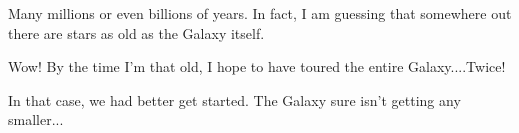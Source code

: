 \documentclass[main.tex]{subfiles}
\begin{document}
\par \Celaeno Many millions or even billions of years.  In fact, I am guessing that somewhere out there are stars as old as the Galaxy itself.

\par \Lacedaemon Wow!  By the time I'm that old, I hope to have toured the entire Galaxy....Twice!

\par \Celaeno In that case, we had better get started.  The Galaxy sure isn't getting any smaller...

%
%
%
%
%
%
%
%
%
%
%
%
\end{document}
